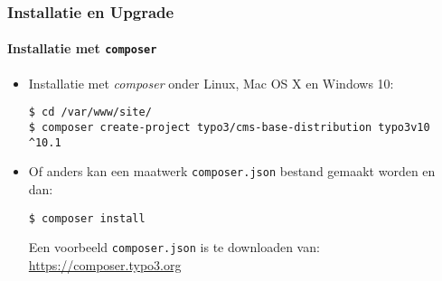 
\begin{frame}[fragile]
	\frametitle{Installatie en Upgrade}
	\framesubtitle{Installatie met \texttt{composer}}

	\begin{itemize}
		\item Installatie met \textit{composer} onder Linux, Mac OS X en Windows 10:

			\begin{lstlisting}
$ cd /var/www/site/
$ composer create-project typo3/cms-base-distribution typo3v10 ^10.1
			\end{lstlisting}

		\item Of anders kan een maatwerk \texttt{composer.json} bestand gemaakt worden en dan:

			\begin{lstlisting}
$ composer install
			\end{lstlisting}

			Een voorbeeld \texttt{composer.json} is te downloaden van:\newline
			\smaller
				\href{https://composer.typo3.org}{https://composer.typo3.org}
			\normalsize

	\end{itemize}
\end{frame}

